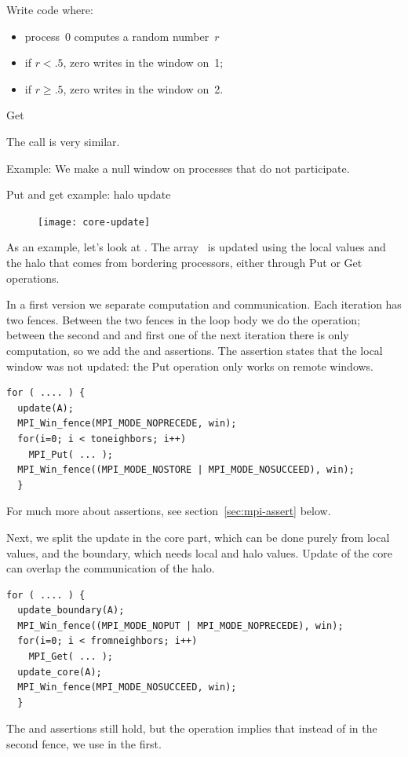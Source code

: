 \begin{exercise}
  \label{ex:randomput}
  Write code where:
  \begin{itemize}
  \item
    process~0 computes a random number~$r$
  \item if $r<.5$, zero writes in the window on~1;
  \item if $r\geq .5$, zero writes in the window on~2.
  \end{itemize}
\end{exercise}

 {Get}

The  call is very similar.

Example:
%
%
We make a null window on processes that do not participate.
%

 {Put and get example: halo update}

\begin{figure}
  \texttt{[image: core-update]}
\end{figure}
%
As an example, let's look at .
The array~ is updated using the local values and the halo
that comes from bordering processors, either through Put or Get operations.

In a first version we separate computation and communication.
Each iteration has two fences. Between the two fences in the loop body
we do the  operation; between the second and and first one
of the next iteration there is only computation, so we add the
 and  assertions. 
The  assertion
states that the local window was not updated: the Put operation only
works on remote windows.
\begin{lstlisting}
for ( .... ) {
  update(A); 
  MPI_Win_fence(MPI_MODE_NOPRECEDE, win); 
  for(i=0; i < toneighbors; i++) 
    MPI_Put( ... );
  MPI_Win_fence((MPI_MODE_NOSTORE | MPI_MODE_NOSUCCEED), win); 
  }
\end{lstlisting}
For much more about
assertions, see section~\ref{sec:mpi-assert} below.

Next, we split the update in the core part, which can be done purely
from local values, and the boundary, which needs local and halo
values. Update of the core can overlap the communication of the halo.
\begin{lstlisting}
for ( .... ) {
  update_boundary(A); 
  MPI_Win_fence((MPI_MODE_NOPUT | MPI_MODE_NOPRECEDE), win); 
  for(i=0; i < fromneighbors; i++) 
    MPI_Get( ... );
  update_core(A); 
  MPI_Win_fence(MPI_MODE_NOSUCCEED, win); 
  }
\end{lstlisting}
The  and  assertions still hold, but the
 operation implies that instead of  in the
second fence, we use  in the first.


